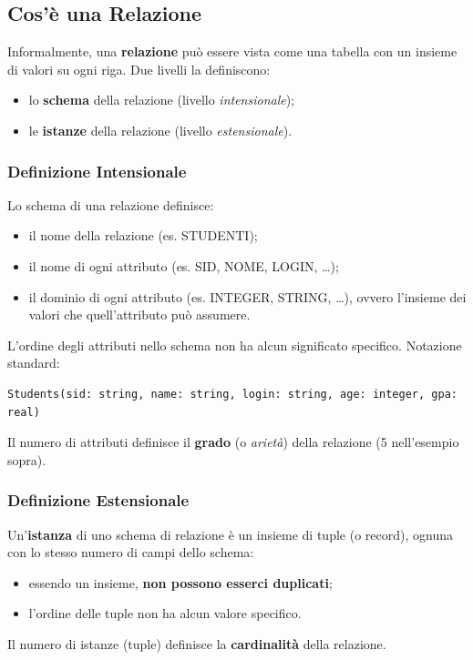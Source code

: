 \documentclass[12pt, a4paper]{article}
\begin{document}
\subsection{Cos'è una Relazione}

Informalmente, una \textcolor{tocsec}{\textbf{relazione}} può essere vista come una tabella con un insieme di valori su ogni riga. Due livelli la definiscono:
\begin{itemize}
    \item lo \textbf{schema} della relazione (livello \textit{intensionale});
    \item le \textbf{istanze} della relazione (livello \textit{estensionale}).
\end{itemize}

\subsubsection{Definizione Intensionale}

Lo schema di una relazione definisce:
\begin{itemize}
    \item il nome della relazione (es. STUDENTI);
    \item il nome di ogni attributo (es. SID, NOME, LOGIN, \ldots);
    \item il dominio di ogni attributo (es. INTEGER, STRING, \ldots), ovvero l'insieme dei valori che quell'attributo può assumere.
\end{itemize}
L'ordine degli attributi nello schema non ha alcun significato specifico. Notazione standard:
\begin{verbatim}
Students(sid: string, name: string, login: string, age: integer, gpa: real)
\end{verbatim}
Il numero di attributi definisce il \textbf{grado} (o \textit{arietà}) della relazione (5 nell'esempio sopra).

\subsubsection{Definizione Estensionale}

Un'\textbf{istanza} di uno schema di relazione è un insieme di tuple (o record), ognuna con lo stesso numero di campi dello schema:
\begin{itemize}
    \item essendo un insieme, \textbf{non possono esserci duplicati};
    \item l'ordine delle tuple non ha alcun valore specifico.
\end{itemize}
Il numero di istanze (tuple) definisce la \textbf{cardinalità} della relazione.
\end{document}

